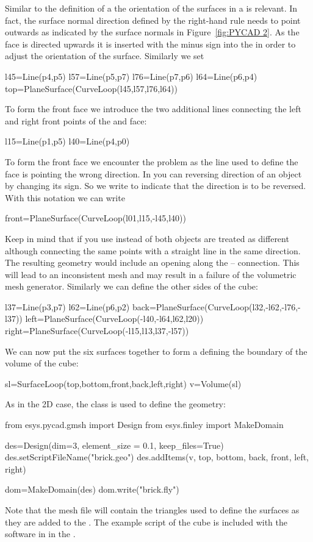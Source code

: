 Similar to the definition of a  the orientation of the
surfaces in a  is relevant.
In fact, the surface normal direction defined by the right-hand rule needs to
point outwards as indicated by the surface normals in Figure~\ref{fig:PYCAD 2}.
As the  face is directed upwards it is inserted with the minus
sign into the  in order to adjust the orientation of the
surface. Similarly we set 
\begin{python}
  l45=Line(p4,p5)
  l57=Line(p5,p7)
  l76=Line(p7,p6)
  l64=Line(p6,p4)
  top=PlaneSurface(CurveLoop(l45,l57,l76,l64))
\end{python}
To form the front face we introduce the two additional lines connecting the
left and right front points of the  and  face:
\begin{python}
  l15=Line(p1,p5)
  l40=Line(p4,p0)
\end{python}
To form the front face we encounter the problem as the line  used
to define the  face is pointing the wrong direction.
In \pycad you can reversing direction of an object by changing its sign.
So we write  to indicate that the direction is to be reversed.
With this notation we can write
\begin{python}
  front=PlaneSurface(CurveLoop(l01,l15,-l45,l40))
\end{python}
Keep in mind that if you use  instead of  both
objects are treated as different although connecting the same points with a
straight line in the same direction. The resulting geometry would include an
opening along the -- connection.
This will lead to an inconsistent mesh and may result in a failure of the
volumetric mesh generator. Similarly we can define the other sides of the cube:
\begin{python}
  l37=Line(p3,p7)
  l62=Line(p6,p2)
  back=PlaneSurface(CurveLoop(l32,-l62,-l76,-l37))
  left=PlaneSurface(CurveLoop(-l40,-l64,l62,l20))
  right=PlaneSurface(CurveLoop(-l15,l13,l37,-l57))
\end{python}
We can now put the six surfaces together to form a 
defining the boundary of the volume of the cube:
\begin{python}
  sl=SurfaceLoop(top,bottom,front,back,left,right)
  v=Volume(sl)
\end{python}
As in the 2D case, the  class is used to define the geometry:
\begin{python}
  from esys.pycad.gmsh import Design
  from esys.finley import MakeDomain

  des=Design(dim=3, element_size = 0.1, keep_files=True)
  des.setScriptFileName("brick.geo")
  des.addItems(v, top, bottom, back, front, left, right)

  dom=MakeDomain(des)
  dom.write("brick.fly")
\end{python}
Note that the \finley mesh file  will contain the
triangles used to define the surfaces as they are added to the .
The example script of the cube is included with the software in
 in the \ExampleDirectory.


